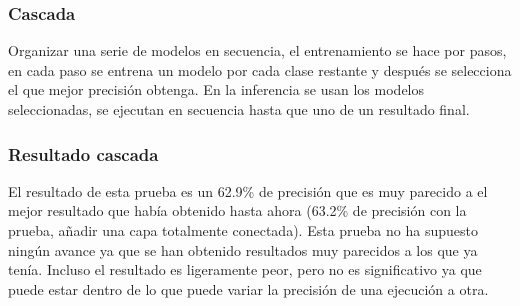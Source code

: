 \documentclass{beamer}
\begin{document}
\begin{frame}
\frametitle{Cascada}

Organizar una serie de modelos en secuencia, el entrenamiento se hace por pasos, en cada paso se entrena un modelo por cada clase restante y después se selecciona el que mejor precisión obtenga. En la inferencia se usan los modelos seleccionadas, se ejecutan en secuencia hasta que uno de un resultado final.

\begin{figure}[H]
\centering
{}%
\qquad
{}%
\end{figure}

\end{frame}



\begin{frame}
\frametitle{Resultado cascada}

\begin{table}[H]
\centering
{}
\caption{Resultado cascada.}
\end{table}

El resultado de esta prueba es un 62.9\% de precisión que es muy parecido a el mejor resultado que había obtenido hasta ahora (63.2\% de precisión con la prueba, añadir una capa totalmente conectada). Esta prueba no ha supuesto ningún avance ya que se han obtenido resultados muy parecidos a los que ya tenía. Incluso el resultado es ligeramente peor, pero no es significativo ya que puede estar dentro de lo que puede variar la precisión de una ejecución a otra.

\end{frame}
\end{document}
